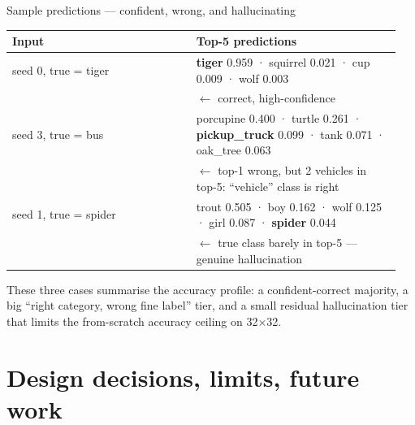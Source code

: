 \documentclass[aspectratio=169,10pt]{beamer}
\begin{document}
\begin{frame}{Sample predictions — confident, wrong, and hallucinating}
  \footnotesize\ttfamily
  \begin{tabular}{@{}p{0.45\linewidth}p{0.5\linewidth}@{}}\toprule
    \textrm{\textbf{Input}} & \textrm{\textbf{Top-5 predictions}} \\ \midrule
    seed 0, true = tiger &
      \textbf{tiger} 0.959 · squirrel 0.021 · cup 0.009 · wolf 0.003 \\
      & \textrm{$\leftarrow$ correct, high-confidence} \\ \midrule
    seed 3, true = bus &
      porcupine 0.400 · turtle 0.261 · \textbf{pickup\_truck} 0.099 · tank 0.071 · oak\_tree 0.063 \\
      & \textrm{$\leftarrow$ top-1 wrong, but 2 vehicles in top-5: ``vehicle'' class is right} \\ \midrule
    seed 1, true = spider &
      trout 0.505 · boy 0.162 · wolf 0.125 · girl 0.087 · \textbf{spider} 0.044 \\
      & \textrm{$\leftarrow$ true class barely in top-5 — genuine hallucination} \\ \bottomrule
  \end{tabular}

  \vspace{0.5em}\rmfamily\small
  These three cases summarise the accuracy profile: a confident-correct majority, a
  big ``right category, wrong fine label'' tier, and a small residual hallucination tier
  that limits the from-scratch accuracy ceiling on 32$\times$32.
\end{frame}

\section{Design decisions, limits, future work}
\end{document}
